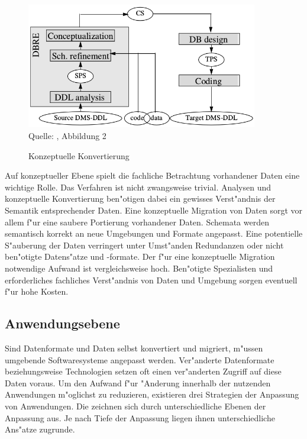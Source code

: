 \begin{figure}[h!]
	\centering
	\caption{Konzeptuelle Konvertierung}
	\label{pic:conversion_conceptual}
	\includegraphics[width=0.9\textwidth]{../images/strategies_fig_02b.png} \\
	\tiny Quelle: \citep{henrard-2002}, Abbildung 2
\end{figure}

Auf konzeptueller Ebene spielt die fachliche Betrachtung vorhandener Daten eine wichtige Rolle. Das Verfahren ist nicht zwangsweise trivial. Analysen und konzeptuelle Konvertierung ben"otigen dabei ein gewisses Verst"andnis der Semantik entsprechender Daten.
\lb
Eine konzeptuelle Migration von Daten sorgt vor allem f"ur eine saubere Portierung vorhandener Daten. Schemata werden semantisch korrekt an neue Umgebungen und Formate angepasst. Eine potentielle S"auberung der Daten verringert unter Umst"anden Redundanzen oder nicht ben"otigte Datens"atze und -formate.
\newpage
Der f"ur eine konzeptuelle Migration notwendige Aufwand ist vergleichsweise hoch. Ben"otigte Spezialisten und erforderliches fachliches Verst"andnis von Daten und Umgebung sorgen eventuell f"ur hohe Kosten.

\subsection{Anwendungsebene}

Sind Datenformate und Daten selbst konvertiert und migriert, m"ussen umgebende Softwaresysteme angepasst werden. Ver"anderte Datenformate beziehungsweise Technologien setzen oft einen ver"anderten Zugriff auf diese Daten voraus. Um den Aufwand f"ur "Anderung innerhalb der nutzenden Anwendungen m"oglichst zu reduzieren, existieren drei Strategien der Anpassung von Anwendungen. Die zeichnen sich durch unterschiedliche Ebenen der Anpassung aus. Je nach Tiefe der Anpassung liegen ihnen unterschiedliche Ans"atze zugrunde. 

